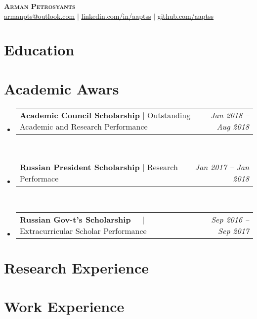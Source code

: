 \documentclass[a4paper,11pt]{article}
\makeatletter
\newcommand{\resumeProjectHeading}[2]{
    \item
    \begin{tabular*}{0.97\textwidth}{l@{\extracolsep{\fill}}r}
      \small#1 & #2 \\
    \end{tabular*}\vspace{-7pt}
}
\newcommand{\resumeSubHeadingListStart}{\begin{itemize}[leftmargin=0.15in, label={}]}
\newcommand{\resumeSubHeadingListEnd}{\end{itemize}}
\newcommand{\DesPosition}{ }
\makeatother
\begin{document}
\begin{center}
    \textbf{\Huge \scshape Arman Petrosyants \DesPosition } \\ \vspace{1pt}
    \href{mailto:armanpts@outlook.com}{\underline{armanpts@outlook.com}} $|$ 
    \href{https://linkedin.com/in/aaptss}{\underline{linkedin.com/in/aaptss}} $|$
    \href{https://github.com/aaptss}{\underline{github.com/aaptss}}
\end{center}

\section{Education}
  \resumeSubHeadingListStart
	
	
  \resumeSubHeadingListEnd

\section{Academic Awars}
    \resumeSubHeadingListStart      
      \resumeProjectHeading
          {\textbf{Academic Council Scholarship} $|$ {Outstanding Academic and Research Performance}}{\emph{Jan 2018 -- Aug 2018}}\\
      \resumeProjectHeading
          {\textbf{Russian President Scholarship} $|$ {Research Performace}}{\emph{Jan 2017 -- Jan 2018}}\\
      \resumeProjectHeading
          {\textbf{Russian Gov-t's Scholarship} $\> \> \> \> \> |$ {Extracurricular Scholar Performance}}{\emph{Sep 2016 -- Sep 2017}}
    \resumeSubHeadingListEnd

\section{Research Experience}
  \resumeSubHeadingListStart
	
  	
  
	  
  \resumeSubHeadingListEnd
  
  \newpage
  
\section{Work Experience}
  \resumeSubHeadingListStart
 	 
 	 
  \resumeSubHeadingListEnd
\end{document}
